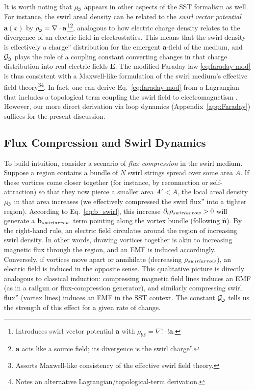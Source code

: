\documentclass[12pt]{article}
\DeclareRobustCommand{\swirlarrow}{
\mathchoice{\mkern-2mu\scriptstyle\boldsymbol{\circlearrowleft}}%
{\mkern-2mu\scriptstyle\boldsymbol{\circlearrowleft}}%
{\mkern-2mu\scriptscriptstyle\boldsymbol{\circlearrowleft}}%
{\mkern-2mu\scriptscriptstyle\boldsymbol{\circlearrowleft}}
}%
\begin{document}
It is worth noting that $\rho_{\swirlarrow}$ appears in other aspects of the SST formalism as well. For instance, the swirl areal density can be related to the \emph{swirl vector potential} $\mathbf{a}(x)$ by $\rho_{\swirlarrow} = \nabla \cdot \mathbf{a}$\footnote{Introduces swirl vector potential $\mathbf a$ with $\rho_{!\circlearrowleft}=\nabla!\cdot!\mathbf a$.}\footnote{$\mathbf a$ acts like a source field; its divergence is the swirl charge''.}, analogous to how electric charge density relates to the divergence of an electric field in electrostatics. This means that the swirl density is effectively a charge'' distribution for the emergent $\mathbf{a}$-field of the medium, and $\mathcal{G}_{\swirlarrow}$ plays the role of a coupling constant converting changes in that charge distribution into real electric fields $\mathbf{E}$. The modified Faraday law \eqref{eq:faraday-mod} is thus consistent with a Maxwell-like formulation of the swirl medium’s effective field theory\footnote{Asserts Maxwell-like consistency of the effective swirl field theory.}\footnote{Notes an alternative Lagrangian/topological-term derivation.}. In fact, one can derive Eq.~\eqref{eq:faraday-mod} from a Lagrangian that includes a topological term coupling the swirl field to electromagnetism \cite{Iskandarani2025RotatingFrame}. However, our more direct derivation via loop dynamics (Appendix~\ref{app:Faraday}) suffices for the present discussion.


\subsection*{Flux Compression and Swirl Dynamics}

To build intuition, consider a scenario of \emph{flux compression} in the swirl medium. Suppose a region contains a bundle of $N$ swirl strings spread over some area $A$. If these vortices come closer together (for instance, by reconnection or self-attraction) so that they now pierce a smaller area $A' < A$, the local areal density $\rho_{\swirlarrow}$ in that area increases (we effectively compressed the swirl flux'' into a tighter region). According to Eq.~\eqref{eq:b_swirl}, this increase $\partial_t \rho_{\\swirlarrow}>0$ will generate a $\mathbf{b}_{\\swirlarrow}$ term pointing along the vortex bundle (following $\hat{\mathbf{n}}$). By the right-hand rule, an electric field circulates around the region of increasing swirl density. In other words, drawing vortices together is akin to increasing magnetic flux through the region, and an EMF is induced accordingly. Conversely, if vortices move apart or annihilate (decreasing $\rho_{\\swirlarrow}$), an electric field is induced in the opposite sense. This qualitative picture is directly analogous to classical induction: compressing magnetic field lines induces an EMF (as in a railgun or flux-compression generator), and similarly compressing swirl flux'' (vortex lines) induces an EMF in the SST context. The constant $\mathcal{G}_{\swirlarrow}$ tells us the strength of this effect for a given rate of change.
\end{document}
